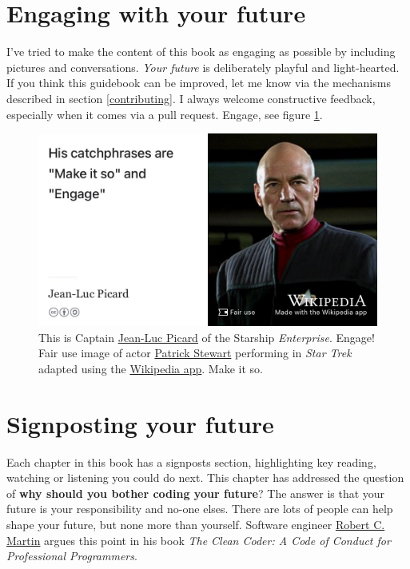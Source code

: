 \documentclass[
]{book}
\begin{document}
\hypertarget{engage}{%
\section{Engaging with your future}\label{engage}}

I've tried to make the content of this book as engaging as possible by including pictures and conversations. \emph{Your future} is deliberately playful and light-hearted. If you think this guidebook can be improved, let me know via the mechanisms described in section \ref{contributing}. I always welcome constructive feedback, especially when it comes via a pull request. Engage, see figure \ref{fig:startrek-fig}.

\begin{figure}

{\centering \includegraphics[width=1\linewidth]{images/captain-jean-luc-picard} 

}

\caption{This is Captain \href{https://en.wikipedia.org/wiki/Jean-Luc_Picard}{Jean-Luc Picard} of the Starship \emph{Enterprise}. Engage! Fair use image of actor \href{https://en.wikipedia.org/wiki/Patrick_Stewart}{Patrick Stewart} performing in \emph{Star Trek} adapted using the \href{https://apps.apple.com/us/app/wikipedia/id324715238}{Wikipedia app}. Make it so.}\label{fig:startrek-fig}
\end{figure}



\hypertarget{sign1}{%
\section{Signposting your future}\label{sign1}}

Each chapter in this book has a signposts section, highlighting key reading, watching or listening you could do next. This chapter has addressed the question of \textbf{why should you bother coding your future}? The answer is that your future is your responsibility and no-one elses. There are lots of people can help shape your future, but none more than yourself. Software engineer \href{https://en.wikipedia.org/wiki/Robert_C._Martin}{Robert C. Martin} argues this point in his book \emph{The Clean Coder: A Code of Conduct for Professional Programmers}. \citep{cleancoder}
\end{document}
